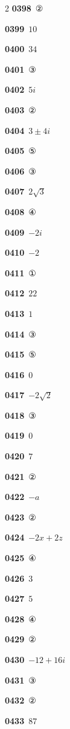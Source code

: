 \documentclass[10pt,a4paper]{article}
\begin{document}
\begin{multicols}{2}
\noindent\textbf{0398}\ ②\par
\noindent\textbf{0399}\ $10$\par
\noindent\textbf{0400}\ $34$\par
\noindent\textbf{0401}\ ③\par
\noindent\textbf{0402}\ $5i$\par
\noindent\textbf{0403}\ ②\par
\noindent\textbf{0404}\ $3\pm 4i$\par
\noindent\textbf{0405}\ ⑤\par
\noindent\textbf{0406}\ ③\par
\noindent\textbf{0407}\ $2\sqrt{3}$\par
\noindent\textbf{0408}\ ④\par
\noindent\textbf{0409}\ $-2i$\par
\noindent\textbf{0410}\ $-2$\par
\noindent\textbf{0411}\ ①\par
\noindent\textbf{0412}\ $22$\par
\noindent\textbf{0413}\ $1$\par
\noindent\textbf{0414}\ ③\par
\noindent\textbf{0415}\ ⑤\par
\noindent\textbf{0416}\ $0$\par
\noindent\textbf{0417}\ $-2\sqrt{2}$\par
\noindent\textbf{0418}\ ③\par
\noindent\textbf{0419}\ $0$\par
\noindent\textbf{0420}\ $7$\par
\noindent\textbf{0421}\ ②\par
\noindent\textbf{0422}\ $-a$\par
\noindent\textbf{0423}\ ②\par
\noindent\textbf{0424}\ $-2x+2z$\par
\noindent\textbf{0425}\ ④\par
\noindent\textbf{0426}\ $3$\par
\noindent\textbf{0427}\ $5$\par
\noindent\textbf{0428}\ ④\par
\noindent\textbf{0429}\ ②\par
\noindent\textbf{0430}\ $-12+16i$\par
\noindent\textbf{0431}\ ③\par
\noindent\textbf{0432}\ ②\par
\noindent\textbf{0433}\ $87$\par

\end{multicols}
\end{document}
